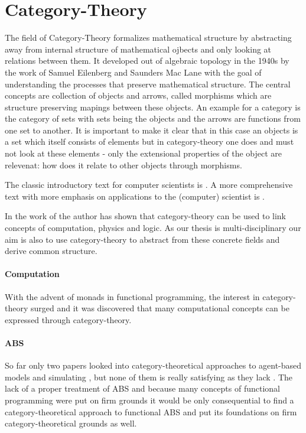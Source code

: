 \section{Category-Theory}
The field of Category-Theory formalizes mathematical structure by abstracting away from internal structure of mathematical ojbects and only looking at relations between them. It developed out of algebraic topology in the 1940s by the work of Samuel Eilenberg and Saunders Mac Lane with the goal of understanding the processes that preserve mathematical structure.
The central concepts are collection of objects and arrows, called morphisms which are structure preserving mapings between these objects. An example for a category is the category of sets with sets being the objects and the arrows are functions from one set to another. It is important to make it clear that in this case an objects is a set which itself consists of elements but in category-theory one does and must not look at these elements - only the extensional properties of the object are relevenat: how does it relate to other objects through morphisms.

The classic introductory text for computer scientists is \cite{pierce_basic_1991}. A more comprehensive text with more emphasis on applications to the (computer) scientist is \cite{spivak_category_2014}.

In the work of  \cite{baez_physics_2009} the author has shown that category-theory can be used to link concepts of computation, physics and logic. As our thesis is multi-disciplinary our aim is also to use category-theory to abstract from these concrete fields and derive common structure.

\paragraph{Computation}
With the advent of monads in functional programming, the interest in category-theory surged and it was discovered that many computational concepts can be expressed through category-theory.

\paragraph{ABS}
So far only two papers looked into category-theoretical approaches to agent-based models and simulating \cite{beheshti_analyzing_2013}, \cite{lloyd_category-theoretic_2010} but none of them is really satisfying as they lack . The lack of a proper treatment of ABS and because many concepts of functional programming were put on firm grounds it would be only consequential to find a category-theoretical approach to functional ABS and put its foundations on firm category-theoretical grounds as well.

